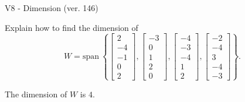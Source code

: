 \begin{exercise}
  \begin{exerciseTitle}V8 - Dimension (ver. 146)\end{exerciseTitle}
  \begin{exerciseStatement}
    Explain how to find the dimension of 
\[W=\mathrm{span}\ \left\{\left[\begin{array}{r}
2 \\
-4 \\
-1 \\
0 \\
2
\end{array}\right] , \left[\begin{array}{r}
-3 \\
0 \\
1 \\
2 \\
0
\end{array}\right] , \left[\begin{array}{r}
-4 \\
-3 \\
-4 \\
1 \\
2
\end{array}\right] , \left[\begin{array}{r}
-2 \\
-4 \\
3 \\
-4 \\
-3
\end{array}\right]\right\}.\]



  \end{exerciseStatement}
  \begin{exerciseAnswer}
   The dimension of \(W\) is  \(4\).
  


  \end{exerciseAnswer}
\end{exercise}